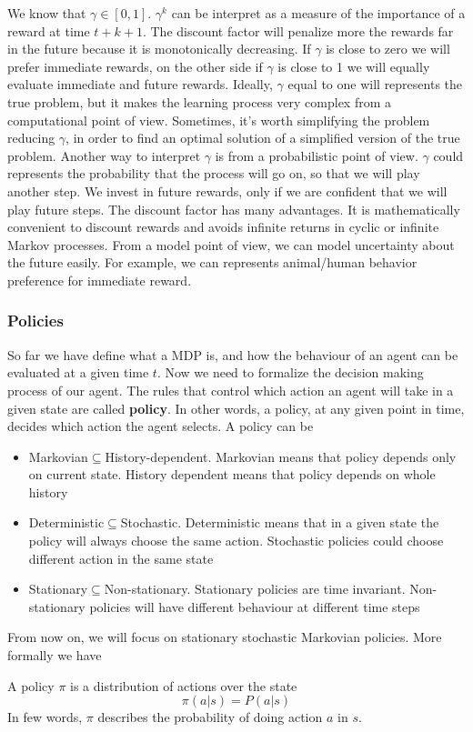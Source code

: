 \documentclass[main.tex]{subfiles}
\begin{document}
We know that $\gamma \in [0,1]$. $\gamma^k$ can be interpret as a measure of the importance of a reward at time $t+k+1$. The discount factor will penalize more the rewards far in the future because it is monotonically decreasing. If $\gamma$ is close to zero we will prefer immediate rewards, on the other side if $\gamma$ is close to 1 we will equally evaluate immediate and future rewards. Ideally, $\gamma$ equal to one will represents the true problem, but it makes the learning process very complex from a computational point of view. Sometimes, it's worth simplifying the problem reducing $\gamma$, in order to find an optimal solution of a simplified version of the true problem. Another way to interpret $\gamma$ is from a probabilistic point of view. $\gamma$ could represents the probability that the process will go on, so that we will play another step. We invest in future rewards, only if we are confident that we will play future steps. The discount factor has many advantages. It is mathematically convenient to discount rewards and avoids infinite returns in cyclic or infinite Markov processes. From a model point of view, we can model uncertainty about the future easily. For example, we can represents animal/human behavior preference for immediate reward.

\subsubsection{Policies} So far we have define what a MDP is, and how the behaviour of an agent can be evaluated at a given time $t$. Now we need to formalize the decision making process of our agent. The rules that control which action an agent will take in a given state are called \textbf{policy}. In other words, a policy, at any given point in time, decides which action the agent selects. A policy can be
\begin{itemize}
    \item Markovian$\subseteq$History-dependent. Markovian means that policy depends only on current state. History dependent means that policy depends on whole history
    \item Deterministic$\subseteq$Stochastic. Deterministic means that in a given state the policy will always choose the same action. Stochastic policies could choose different action in the same state
    \item Stationary$\subseteq$Non-stationary. Stationary policies are time invariant. Non-stationary policies will have different behaviour at different time steps
\end{itemize}
From now on, we will focus on stationary stochastic Markovian policies. More formally we have
\begin{definition}
A policy $\pi$ is a distribution of actions over the state
\begin{equation*}
    \pi(a|s) = P(a|s)
\end{equation*}
In few words, $\pi$ describes the probability of doing action $a$ in $s$.
\end{definition}
\end{document}

